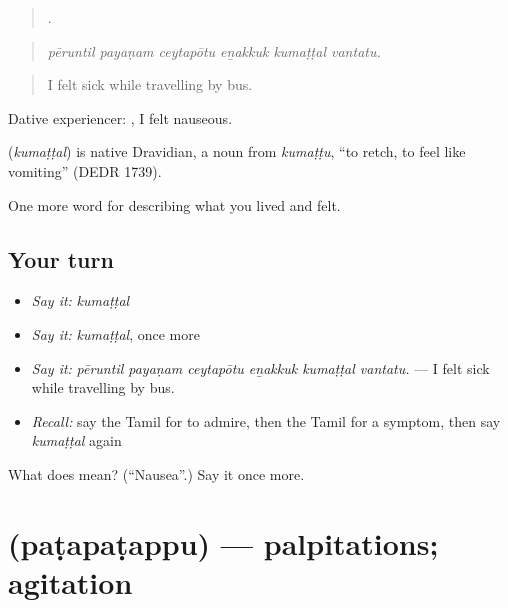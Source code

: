 \begin{quote}
     .
\end{quote}

\begin{quote}
\emph{pēruntil payaṇam ceytapōtu eṉakkuk kumaṭṭal vantatu.}
\end{quote}

\begin{quote}
I felt sick while travelling by bus.
\end{quote}

Dative experiencer:   , I felt nauseous.

\begin{cousinweb}
\textbf{} (\emph{kumaṭṭal}) is native Dravidian, a noun from  \emph{kumaṭṭu}, \textquotedblleft{}to retch, to feel like vomiting\textquotedblright{} (DEDR 1739).
\end{cousinweb}

\begin{grammarlens}[title={What you've built}]
One more word for describing what you lived and felt.
\end{grammarlens}

\subsection*{Your turn}
\begin{itemize}
\raggedright
  \item \emph{Say it:} \emph{kumaṭṭal}
  \item \emph{Say it:} \emph{kumaṭṭal}, once more
  \item \emph{Say it:} \emph{pēruntil payaṇam ceytapōtu eṉakkuk kumaṭṭal vantatu.} — I felt sick while travelling by bus.
  \item \emph{Recall:} say the Tamil for to admire, then the Tamil for a symptom, then say \emph{kumaṭṭal} again
\end{itemize}

\begin{tcolorbox}[breakable,colback=teal!4,colframe=teal!35!black,title={Before you move on}]
What does  mean? (\textquotedblleft{}Nausea\textquotedblright{}.) Say it once more.
\end{tcolorbox}
\section[\texorpdfstring{\ta{படபடப்பு} (paṭapaṭappu)}{படபடப்பு (paṭapaṭappu)}]{ (paṭapaṭappu) — palpitations; agitation}

